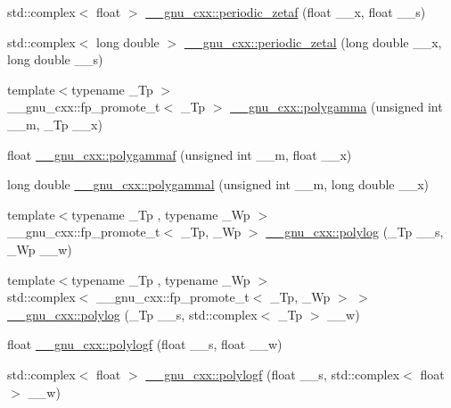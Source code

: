 \begin{DoxyCompactItemize}
\item 
std\+::complex$<$ float $>$ \hyperlink{group__mathsf__gnu_ga1308c2a5d1b263757485cb48eb2c19ff}{\+\_\+\+\_\+gnu\+\_\+cxx\+::periodic\+\_\+zetaf} (float \+\_\+\+\_\+x, float \+\_\+\+\_\+s)
\item 
std\+::complex$<$ long double $>$ \hyperlink{group__mathsf__gnu_gab7573fb57ebaabac4432bb5e6b525151}{\+\_\+\+\_\+gnu\+\_\+cxx\+::periodic\+\_\+zetal} (long double \+\_\+\+\_\+x, long double \+\_\+\+\_\+s)
\item 
{\footnotesize template$<$typename \+\_\+\+Tp $>$ }\\\+\_\+\+\_\+gnu\+\_\+cxx\+::fp\+\_\+promote\+\_\+t$<$ \+\_\+\+Tp $>$ \hyperlink{group__mathsf__gnu_ga65e674e7fe1457e819897e0d608c18b8}{\+\_\+\+\_\+gnu\+\_\+cxx\+::polygamma} (unsigned int \+\_\+\+\_\+m, \+\_\+\+Tp \+\_\+\+\_\+x)
\item 
float \hyperlink{group__mathsf__gnu_ga91861fadef76d4f73afacffcac66e312}{\+\_\+\+\_\+gnu\+\_\+cxx\+::polygammaf} (unsigned int \+\_\+\+\_\+m, float \+\_\+\+\_\+x)
\item 
long double \hyperlink{group__mathsf__gnu_gaa6a37359a97ba43f32aa842705c416d4}{\+\_\+\+\_\+gnu\+\_\+cxx\+::polygammal} (unsigned int \+\_\+\+\_\+m, long double \+\_\+\+\_\+x)
\item 
{\footnotesize template$<$typename \+\_\+\+Tp , typename \+\_\+\+Wp $>$ }\\\+\_\+\+\_\+gnu\+\_\+cxx\+::fp\+\_\+promote\+\_\+t$<$ \+\_\+\+Tp, \+\_\+\+Wp $>$ \hyperlink{group__mathsf__gnu_gabcc5480ad739561c2debd6a8a352084f}{\+\_\+\+\_\+gnu\+\_\+cxx\+::polylog} (\+\_\+\+Tp \+\_\+\+\_\+s, \+\_\+\+Wp \+\_\+\+\_\+w)
\item 
{\footnotesize template$<$typename \+\_\+\+Tp , typename \+\_\+\+Wp $>$ }\\std\+::complex$<$ \+\_\+\+\_\+gnu\+\_\+cxx\+::fp\+\_\+promote\+\_\+t$<$ \+\_\+\+Tp, \+\_\+\+Wp $>$ $>$ \hyperlink{group__mathsf__gnu_ga817a208972a0200b667c68d199176d70}{\+\_\+\+\_\+gnu\+\_\+cxx\+::polylog} (\+\_\+\+Tp \+\_\+\+\_\+s, std\+::complex$<$ \+\_\+\+Tp $>$ \+\_\+\+\_\+w)
\item 
float \hyperlink{group__mathsf__gnu_ga5bcdd35473144a6d8efc258a79bc82d8}{\+\_\+\+\_\+gnu\+\_\+cxx\+::polylogf} (float \+\_\+\+\_\+s, float \+\_\+\+\_\+w)
\item 
std\+::complex$<$ float $>$ \hyperlink{group__mathsf__gnu_ga5376edb72358b777035a78b929deb49f}{\+\_\+\+\_\+gnu\+\_\+cxx\+::polylogf} (float \+\_\+\+\_\+s, std\+::complex$<$ float $>$ \+\_\+\+\_\+w)
\item 

\end{DoxyCompactItemize}
